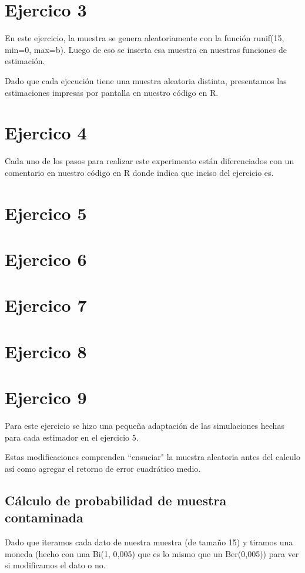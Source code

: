 \documentclass[a4paper]{article}
\begin{document}
\section{Ejercico 3}
En este ejercicio, la muestra se genera aleatoriamente con la función runif(15, min=0, max=b). Luego de eso se inserta esa muestra en nuestras funciones de estimación. 

Dado que cada ejecución tiene una muestra aleatoria distinta, presentamos las estimaciones impresas por pantalla en nuestro código en R.

\section{Ejercico 4}
Cada uno de los pasos para realizar este experimento están diferenciados con un comentario en nuestro código en R donde indica que inciso del ejercicio es.


\section{Ejercico 5}

\section{Ejercico 6}

\section{Ejercico 7}

\section{Ejercico 8}

\section{Ejercico 9}
Para este ejercicio se hizo una pequeña adaptación de las simulaciones hechas para cada estimador en el ejercicio 5. 

Estas modificaciones comprenden ``ensuciar" la muestra aleatoria antes del calculo así como agregar el retorno de error cuadrático medio. 

\subsection{Cálculo de probabilidad de muestra contaminada}
Dado que iteramos cada dato de nuestra muestra (de tamaño 15) y tiramos una moneda (hecho con una Bi(1, 0,005) que es lo mismo que un Ber(0,005)) para ver si modificamos el dato o no. 
\end{document}
